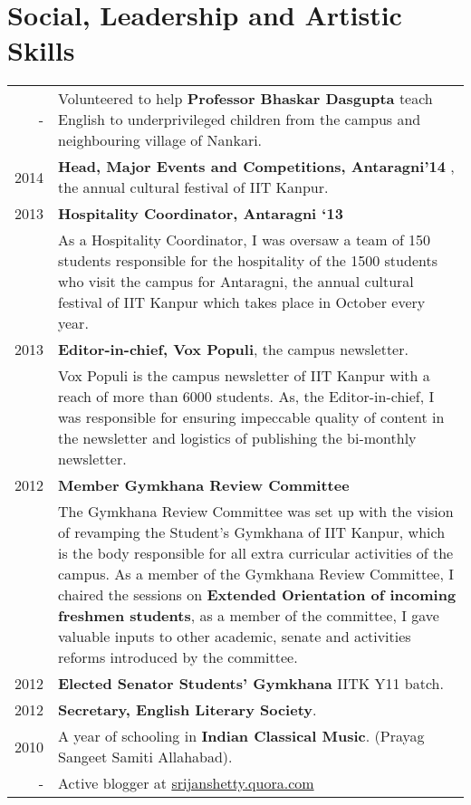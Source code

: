 \documentclass[a4paper,10pt]{article} %
\begin{document}

\section {Social, Leadership and Artistic Skills}
\begin{tabular}{rp{12cm}}

    -    & Volunteered to help \textbf{Professor Bhaskar Dasgupta} teach English to underprivileged children from the campus
           and neighbouring village of Nankari.\\
    2014 & \textbf{Head, Major Events and Competitions, Antaragni'14} , the annual cultural festival of
    IIT Kanpur. \\
    2013 & \textbf{Hospitality Coordinator, Antaragni ‘13}\\
         & \footnotesize{As a Hospitality Coordinator, I was oversaw a team of 150 students responsible for
            the hospitality of the 1500 students who visit the campus for Antaragni, the annual cultural festival
            of IIT Kanpur which takes place in October every year.}\\
    2013 & \textbf{Editor-in-chief, Vox Populi}, the campus newsletter. \\
         & \footnotesize{Vox Populi is the campus newsletter of IIT Kanpur with a reach of more than 6000 students.
            As, the Editor-in-chief, I was responsible for ensuring impeccable quality of content in the newsletter and
            logistics of publishing the bi-monthly newsletter.}\\
    2012 & \textbf{Member Gymkhana Review Committee}\\
         & \footnotesize{The Gymkhana Review Committee was set up with the vision of revamping the Student's Gymkhana
            of IIT Kanpur, which is the body responsible for all extra curricular activities of the campus. As a
            member of the Gymkhana Review Committee, I chaired the sessions on \textbf{Extended Orientation of
            incoming freshmen students}, as a member of the committee, I gave valuable inputs to other academic,
            senate and activities reforms introduced by the committee.}\\
    2012 & \textbf{Elected Senator Students' Gymkhana} IITK Y11 batch. \\
    2012 & \textbf{Secretary, English Literary Society}. \\
    2010 & A year of schooling in \textbf{Indian Classical Music}. (Prayag Sangeet Samiti Allahabad). \\
    -   & Active blogger at \href{srijanshetty.quora.com} {srijanshetty.quora.com} \\

\end{tabular}
\end{document}
